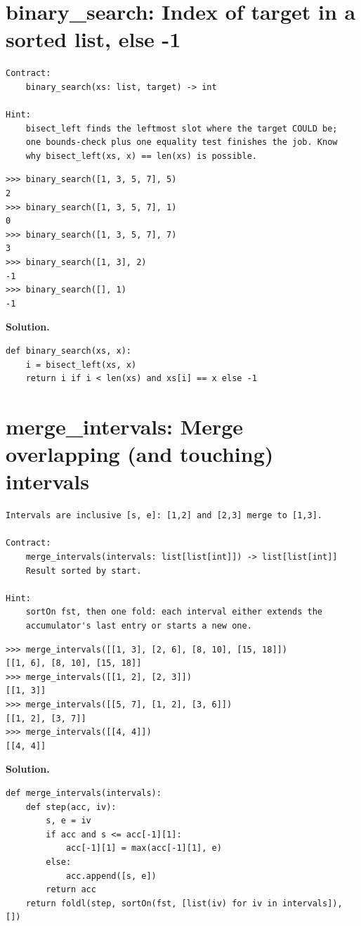 \documentclass[10pt,letterpaper]{book}
\begin{document}
\section{binary\_search: Index of target in a sorted list, else -1}
\begin{lstlisting}[style=ex]
Contract:
    binary_search(xs: list, target) -> int

Hint:
    bisect_left finds the leftmost slot where the target COULD be;
    one bounds-check plus one equality test finishes the job. Know
    why bisect_left(xs, x) == len(xs) is possible.
\end{lstlisting}
\begin{lstlisting}[style=ex]
>>> binary_search([1, 3, 5, 7], 5)
2
>>> binary_search([1, 3, 5, 7], 1)
0
>>> binary_search([1, 3, 5, 7], 7)
3
>>> binary_search([1, 3], 2)
-1
>>> binary_search([], 1)
-1
\end{lstlisting}
\noindent\textbf{Solution.}
\begin{lstlisting}[style=code]
def binary_search(xs, x):
    i = bisect_left(xs, x)
    return i if i < len(xs) and xs[i] == x else -1
\end{lstlisting}

\section{merge\_intervals: Merge overlapping (and touching) intervals}
\begin{lstlisting}[style=ex]
Intervals are inclusive [s, e]: [1,2] and [2,3] merge to [1,3].

Contract:
    merge_intervals(intervals: list[list[int]]) -> list[list[int]]
    Result sorted by start.

Hint:
    sortOn fst, then one fold: each interval either extends the
    accumulator's last entry or starts a new one.
\end{lstlisting}
\begin{lstlisting}[style=ex]
>>> merge_intervals([[1, 3], [2, 6], [8, 10], [15, 18]])
[[1, 6], [8, 10], [15, 18]]
>>> merge_intervals([[1, 2], [2, 3]])
[[1, 3]]
>>> merge_intervals([[5, 7], [1, 2], [3, 6]])
[[1, 2], [3, 7]]
>>> merge_intervals([[4, 4]])
[[4, 4]]
\end{lstlisting}
\noindent\textbf{Solution.}
\begin{lstlisting}[style=code]
def merge_intervals(intervals):
    def step(acc, iv):
        s, e = iv
        if acc and s <= acc[-1][1]:
            acc[-1][1] = max(acc[-1][1], e)
        else:
            acc.append([s, e])
        return acc
    return foldl(step, sortOn(fst, [list(iv) for iv in intervals]), [])
\end{lstlisting}
\end{document}
